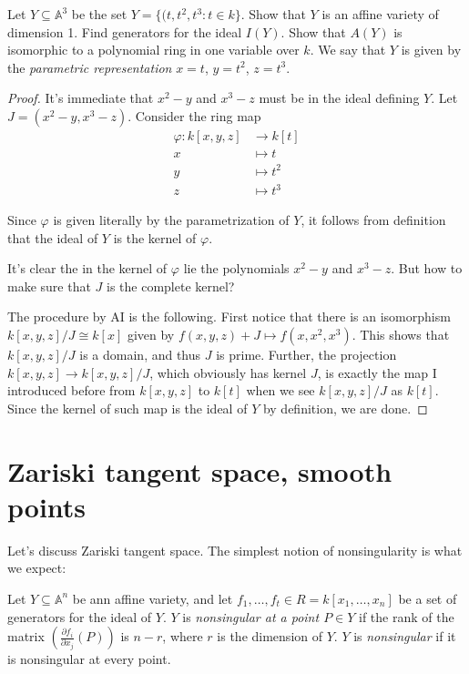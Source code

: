 \documentclass{book}
\begin{document}
\begin{exercise}
\label{exercise-affine-twisted-cubic}
Let $Y\subseteq \mathbb{A}^3$ be the set
$Y= \{(t,t^2,t^3:t \in k\}$.
Show that $Y$ is an affine variety of
dimension 1.
Find generators for the ideal $I(Y)$.
Show that $A(Y)$ is isomorphic to a
polynomial ring in one variable over $k$.
We say that $Y$ is given by the {\it
parametric representation}
$x=t$, $y=t^2$, $z=t^3$.
\end{exercise}

\begin{proof}
It's immediate that $x^2-y$ and $x^3-z$ must
be in
the ideal defining $Y$. Let
$J=(x^2-y,x^3-z)$.
Consider the ring map
$$
\begin{aligned}
\varphi:k[x,y,z] &\longrightarrow k[t] \\
x &\longmapsto t\\
y &\longmapsto t^2\\
z &\longmapsto t^3
\end{aligned}
$$

\noindent
Since $\varphi$ is given literally by the
parametrization of $Y$,
it follows from definition that the ideal of
$Y$
is the kernel of $\varphi$.

It's clear the in the kernel of $\varphi$
lie the polynomials $x^2-y$ and $x^3-z$.
But how to make sure that $J$ is the complete
kernel?

The procedure by AI is the following.
First notice that there is an isomorphism
$k[x,y,z]/J \cong k[x]$
given by $f(x,y,z)+J \mapsto f(x,x^2,x^3)$.
This shows that $k[x,y,z]/J$ is a domain, and
thus $J$ is prime.
Further, the projection $k[x,y,z] \to
k[x,y,z]/J$,
which obviously has kernel $J$,
is exactly the map I introduced before from
$k[x,y,z]$ to $k[t]$ when we see $k[x,y,z]/J$
as $k[t]$.
Since the kernel of such map is the ideal of
$Y$ by definition,
we are done.
\end{proof}

\section{Zariski tangent space, smooth
points}
\label{section-multi-smoot-point-bezou}

\noindent
Let's discuss Zariski tangent space. The
simplest notion of nonsingularity is what we
expect:

\begin{definition}
\label{definition-nonsingular-affine}
Let $Y \subseteq \mathbb{A}^n$ be ann affine
variety,
and let $f_1,…,f_t \in R=k[x_1,…,x_n]$ be a
set of generators
for the ideal of $Y$.
$Y$ is {\it nonsingular at a point $P \in Y$}
if the rank of the matrix
$\left(\frac{\partial f_i}{\partial
x_j}(P)\right)$
is $n-r$, where $r$ is the dimension of $Y$.
$Y$ is {\it nonsingular} if it is nonsingular
at every point.
\end{definition}
\end{document}
